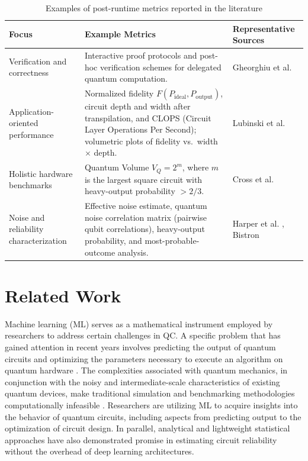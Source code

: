\documentclass{article}
\begin{document}
\begin{table}[htbp]
\renewcommand{\arraystretch}{1.3}
\centering
\caption{Examples of post-runtime metrics reported in the literature}
\label{tab:postruntime-literature-summary}
\footnotesize
\begin{tabular}{|p{2cm}|p{6cm}|p{2.8cm}|}
\hline
\textbf{Focus} & \textbf{Example Metrics} & \textbf{Representative Sources} \\
\hline
Verification and correctness & Interactive proof protocols and post-hoc verification schemes for delegated quantum computation. & Gheorghiu et al. \cite{gheorghiuVerificationQuantumComputation_2019} \\
\hline
Application-oriented performance & Normalized fidelity $F(P_{\text{ideal}}, P_{\text{output}})$, circuit depth and width after transpilation, and CLOPS (Circuit Layer Operations Per Second); volumetric plots of fidelity vs.\ width $\times$ depth. & Lubinski et al. \cite{lubinskiApplicationOrientedPerformanceBenchmarks_2023} \\
\hline
Holistic hardware benchmarks & Quantum Volume $V_Q = 2^m$, where $m$ is the largest square circuit with heavy-output probability $> 2/3$. & Cross et al. \cite{crossValidatingQuantumComputers_2019} \\
\hline
Noise and reliability characterization & Effective noise estimate, quantum noise correlation matrix (pairwise qubit correlations), heavy-output probability, and most-probable-outcome analysis. & Harper et al. \cite{harperEfficientLearningQuantum_2020}, Bistron \cite{bistronBenchmarkingQuantumDevices_2025} \\
\hline
\end{tabular}
\end{table}

\section{Related Work}
\label{section:related-work}

Machine learning (ML) serves as a mathematical instrument employed by researchers to address certain challenges in QC. A specific problem that has gained attention in recent years involves predicting the output of quantum circuits and optimizing the parameters necessary to execute an algorithm on quantum hardware \cite{saravananMachineLearningQuantum_2022, wangQuEstGraphTransformer_2022}. The complexities associated with quantum mechanics, in conjunction with the noisy and intermediate-scale characteristics of existing quantum devices, make traditional simulation and benchmarking methodologies computationally infeasible \cite{aktarPredictingExpressibilityParameterized_2023, liuOutputPredictionQuantum_2025, wangTorchQuantumCaseStudy_2022}. Researchers are utilizing ML to acquire insights into the behavior of quantum circuits, including aspects from predicting output to the optimization of circuit design. In parallel, analytical and lightweight statistical approaches have also demonstrated promise in estimating circuit reliability without the overhead of deep learning architectures.
\end{document}
